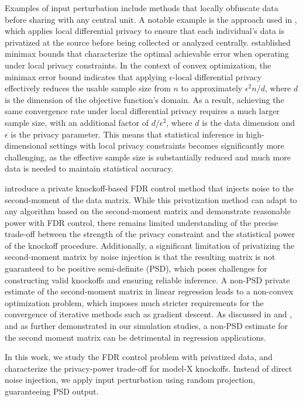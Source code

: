 \documentclass[11pt]{article}
\begin{document}
Examples of input perturbation include methods that locally obfuscate data before sharing with any central unit. A notable example is the approach used in \cite{duchiminimax}, which applies local differential privacy to ensure that each individual's data is privatized at the source before being collected or analyzed centrally. \cite{duchiminimax} established minimax bounds that characterize the optimal achievable error when operating under local privacy constraints.
In the context of convex optimization, the minimax error bound indicates that applying $\epsilon$-local differential privacy effectively reduces the usable sample size from $n$ to approximately $\epsilon^2 n / d$, where $d$ is the dimension of the objective function’s domain. As a result, achieving the same convergence rate under local differential privacy requires a much larger sample size, with an additional factor of 
$d/\epsilon^2$, where 
$d$ is the data dimension and 
$\epsilon$ is the privacy parameter. This means that statistical inference in high-dimensional settings with local privacy constraints becomes significantly more challenging, as the effective sample size is substantially reduced and much more data is needed to maintain statistical accuracy.

\cite{PournaderiXiang} introduce a private knockoff-based FDR control method that injects noise to the second-moment of the data matrix. While this privatization method can adapt to any algorithm based on the second-moment matrix and demonstrate reasonable power with FDR control, there remains limited understanding of the precise trade-off between the strength of the privacy constraint and the statistical power of the knockoff procedure. Additionally, a significant limitation of privatizing the second-moment matrix by noise injection is that the resulting matrix is not guaranteed to be positive semi-definite (PSD), which poses challenges for constructing valid knockoffs and ensuring reliable inference. A non-PSD private estimate of the second-moment matrix in linear regression leads to a non-convex optimization problem, which imposes much stricter requirements for the convergence of iterative methods such as gradient descent. As discussed in \cite{sheffet2015private} and \cite{XKI11}, and as further demonstrated in our simulation studies, a non-PSD estimate for the second moment matrix can be detrimental in regression applications.

 In this work, we study the FDR control problem with privatized data, and characterize the privacy-power trade-off for model-X knockoffs. Instead of direct noise injection, we apply input perturbation using random projection, guaranteeing PSD output.
\end{document}
